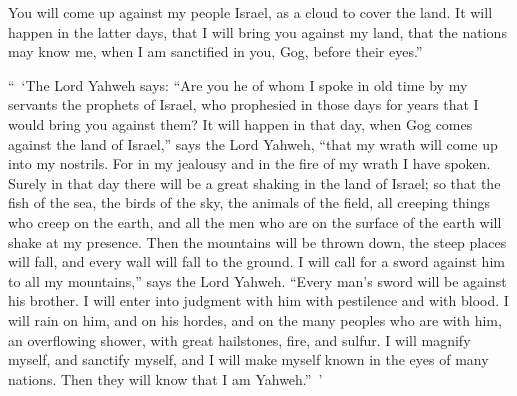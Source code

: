{You will come up against my people Israel, as a cloud to cover the land. It will happen in the latter days, that I will bring you against my land, that the nations may know me, when I am sanctified in you, Gog, before their eyes.”
\par }{\PP {}“ ‘The Lord Yahweh says: “Are you he of whom I spoke in old time by my servants the prophets of Israel, who prophesied in those days for years that I would bring you against them?
It will happen in that day, when Gog comes against the land of Israel,” says the Lord Yahweh, “that my wrath will come up into my nostrils.
For in my jealousy and in the fire of my wrath I have spoken. Surely in that day there will be a great shaking in the land of Israel;
so that the fish of the sea, the birds of the sky, the animals of the field, all creeping things who creep on the earth, and all the men who are on the surface of the earth will shake at my presence. Then the mountains will be thrown down, the steep places will fall, and every wall will fall to the ground.
I will call for a sword against him to all my mountains,” says the Lord Yahweh. “Every man’s sword will be against his brother.
I will enter into judgment with him with pestilence and with blood. I will rain on him, and on his hordes, and on the many peoples who are with him, an overflowing shower, with great hailstones, fire, and sulfur.
I will magnify myself, and sanctify myself, and I will make myself known in the eyes of many nations. Then they will know that I am Yahweh.” ’

}
